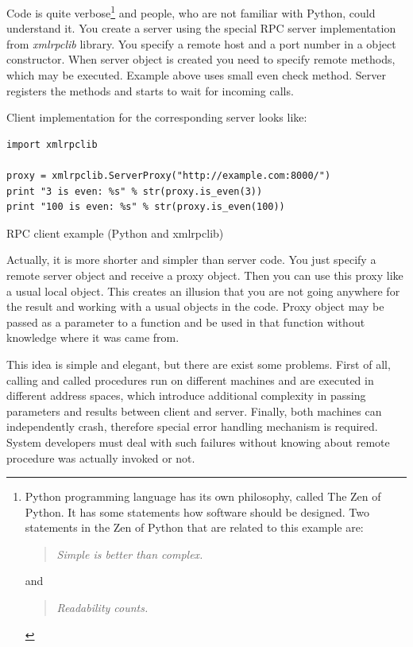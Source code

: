 Code is quite verbose\footnote{Python programming language has its own
philosophy, called The Zen of Python. It has some statements how software
should be designed. Two statements in the Zen of Python that are related to
this example are: \begin{quote}\textit{Simple is better than
complex.}\end{quote}  and \begin{quote}\textit{Readability counts.}\end{quote}}
and people, who are not familiar with Python, could understand it.
You create a server using the special RPC server implementation from
\textit{xmlrpclib} library. You specify a remote host and a port number in a
object constructor. When server object is created you need to specify remote
methods, which may be executed. Example above uses small even check method.
Server registers the methods and starts to wait for incoming calls.

Client implementation for the corresponding server looks like:
\begin{listing}[H]
\begin{verbatim}
import xmlrpclib

proxy = xmlrpclib.ServerProxy("http://example.com:8000/")
print "3 is even: %s" % str(proxy.is_even(3))
print "100 is even: %s" % str(proxy.is_even(100))
\end{verbatim}
\caption{RPC client example (Python and xmlrpclib)}
\label{lst:rpc_client_python_example}
\end{listing}

Actually, it is more shorter and simpler than server code. You just specify a
remote server object and receive a proxy object. Then you can use this proxy like a usual
local object. This creates an illusion that you are not going anywhere for the
result and working with a usual objects in the code. Proxy object may be passed
as a parameter to a function and be used in that function without knowledge
where it was came from.


This idea is simple and elegant, but there are exist some problems. First of
all, calling and called procedures run on different machines and are executed in
different address spaces, which introduce additional complexity in passing
parameters and results between client and server.
Finally, both machines can independently crash, therefore special error
handling mechanism is required. System developers must deal with such failures
without knowing about remote procedure was actually invoked or not.

